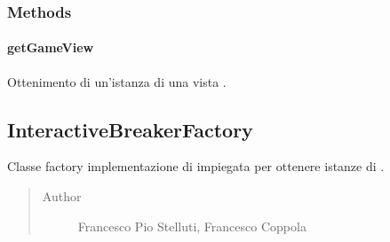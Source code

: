 \documentclass[letterpaper,10pt,italian,openany,oneside]{sphinxmanual}
\begin{document}
\subsubsection{Methods}
\label{\detokenize{source/it/unicam/cs/pa/mastermind/factories/GameViewFactory:methods}}

\paragraph{getGameView}
\label{\detokenize{source/it/unicam/cs/pa/mastermind/factories/GameViewFactory:getgameview}}

\begin{fulllineitems}
\label{\detokenize{source/it/unicam/cs/pa/mastermind/factories/GameViewFactory:it.unicam.cs.pa.mastermind.factories.GameViewFactory.getGameView()}}
Ottenimento di un’istanza di una vista .

\end{fulllineitems}



\subsection{InteractiveBreakerFactory}
\label{\detokenize{source/it/unicam/cs/pa/mastermind/factories/InteractiveBreakerFactory:interactivebreakerfactory}}\label{\detokenize{source/it/unicam/cs/pa/mastermind/factories/InteractiveBreakerFactory::doc}}

\begin{fulllineitems}
\label{\detokenize{source/it/unicam/cs/pa/mastermind/factories/InteractiveBreakerFactory:it.unicam.cs.pa.mastermind.factories.InteractiveBreakerFactory}}
Classe factory implementazione di  impiegata per ottenere istanze di .
\begin{quote}\begin{description}
\item[{Author}] \leavevmode
Francesco Pio Stelluti, Francesco Coppola

\end{description}\end{quote}

\end{fulllineitems}
\end{document}
